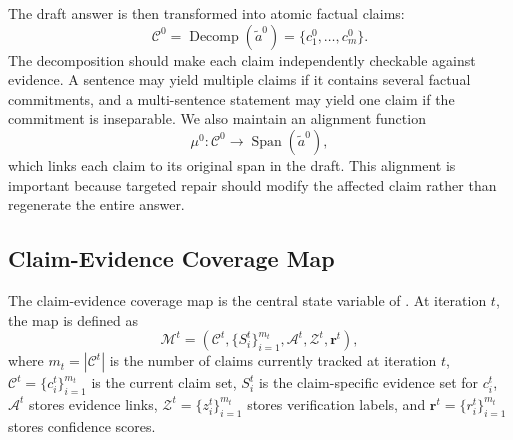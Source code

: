The draft answer is then transformed into atomic factual claims:
\begin{equation}
    \mathcal{C}^{0}
    =
    \operatorname{Decomp}(\tilde{a}^{0})
    =
    \{c_1^{0},\ldots,c_m^{0}\}.
    \label{eq:framework_decomp}
\end{equation}
The decomposition should make each claim independently checkable against evidence. A sentence may yield multiple claims if it contains several factual commitments, and a multi-sentence statement may yield one claim if the commitment is inseparable. We also maintain an alignment function
\begin{equation}
    \mu^{0}: \mathcal{C}^{0}\rightarrow \operatorname{Span}(\tilde{a}^{0}),
    \label{eq:framework_alignment}
\end{equation}
which links each claim to its original span in the draft. This alignment is important because targeted repair should modify the affected claim rather than regenerate the entire answer.




\subsection{Claim-Evidence Coverage Map}
\label{subsec:framework_map}

The claim-evidence coverage map is the central state variable of \ragname. At iteration $t$, the map is defined as
\begin{equation}
    \mathcal{M}^{t}
    =
    \left(
    \mathcal{C}^{t},
    \{S_i^{t}\}_{i=1}^{m_t},
    \mathcal{A}^{t},
    \mathcal{Z}^{t},
    \mathbf{r}^{t}
    \right),
    \label{eq:framework_map}
\end{equation}
where $m_t=|\mathcal{C}^{t}|$ is the number of claims currently tracked at iteration $t$, $\mathcal{C}^{t}=\{c_i^{t}\}_{i=1}^{m_t}$ is the current claim set, $S_i^{t}$ is the claim-specific evidence set for $c_i^{t}$, $\mathcal{A}^{t}$ stores evidence links, $\mathcal{Z}^{t}=\{z_i^{t}\}_{i=1}^{m_t}$ stores verification labels, and $\mathbf{r}^{t}=\{r_i^{t}\}_{i=1}^{m_t}$ stores confidence scores.


